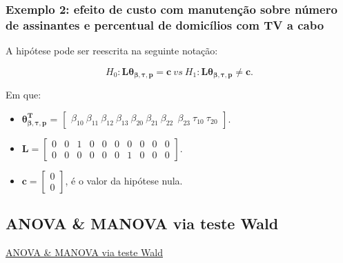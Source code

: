 \documentclass[10pt,
  aspectratio=169,
  serif,
  mathserif,
  professionalfont,
  compress,
  handout,
  ]{beamer}\usepackage[]{graphicx}\usepackage[]{color}
\begin{document}
\begin{frame}

\frametitle{Exemplo 2: efeito de custo com manutenção sobre número\\ de assinantes e percentual de domicílios com TV a cabo}

A hipótese pode ser reescrita na seguinte notação:

$$H_0: \boldsymbol{L}\boldsymbol{\theta_{\beta,\tau,p}} = \boldsymbol{c} \ vs \ H_1: \boldsymbol{L}\boldsymbol{\theta_{\beta,\tau,p}} \neq \boldsymbol{c}.$$ 

Em que:

\begin{itemize}
  
 \item $\boldsymbol{\theta_{\beta,\tau,p}^T}$ = $\begin{bmatrix} \beta_{10} \  \beta_{11} \ \beta_{12} \ \beta_{13} \ \beta_{20} \ \beta_{21} \ \beta_{22} \ \ \beta_{23} \ \tau_{10} \ \tau_{20} \end{bmatrix}$.


\item $\boldsymbol{L} = \begin{bmatrix} 0 & 0 & 1 & 0 & 0 & 0 & 0 & 0 & 0 & 0 \\
0 & 0 & 0 & 0 & 0 & 0 & 1 & 0 & 0 & 0 \end{bmatrix}$.
 
\item $\boldsymbol{c} = \begin{bmatrix} 0 \\ 0 \end{bmatrix}$, é o valor da hipótese nula. 

\end{itemize}

\end{frame}


\subsection{ANOVA \& MANOVA via teste Wald}


\begin{frame}[c, allowframebreaks]

\begin{center}

  {\normalsize \href{https://lineu96.github.io/st/}{ANOVA \& MANOVA via teste Wald}}
  
\end{center}

\end{frame}
\end{document}
